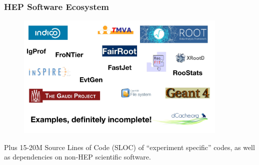 \begin{frame}
\frametitle{HEP Software Ecosystem}

\begin{figure}[htbp]
\begin{center}
\includegraphics[width=0.9\textwidth]{images/hep-software-ecosystem.jpg}
\end{center}
\end{figure}

{\small Plus 15-20M Source Lines of Code (SLOC) of ``experiment specific'' codes, as well as dependencies on non-HEP scientific software.}
\end{frame}


